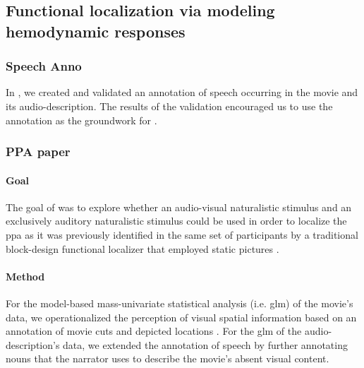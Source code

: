 \subsection{Functional localization via modeling hemodynamic responses}


\subsubsection{Speech Anno}


In \citet{haeusler2021speechanno}, we created and validated an annotation of
speech occurring in the movie and its audio-description.
The results of the validation encouraged us to use the annotation as the
groundwork for \citep{haeusler2022processing}.

\subsubsection{PPA paper}





\paragraph{Goal}

The goal of \citet{haeusler2022processing} was to explore whether an
audio-visual naturalistic stimulus and an exclusively auditory naturalistic
stimulus could be used in order to localize the \ac{ppa} as it was previously
identified in the same set of participants by a traditional block-design
functional localizer that employed static pictures
\citep{sengupta2016extension}.


\paragraph{Method}

For the model-based mass-univariate statistical analysis (i.e. \ac{glm}) of the
movie's data, we operationalized the perception of visual spatial information
based on an annotation of movie cuts and depicted locations
\citep{haeusler2016cutanno}.
For the \ac{glm} of the audio-description's data, we extended the annotation of
speech \citep{haeusler2021speechanno} by further annotating nouns that the
narrator uses to describe the movie's absent visual content.


